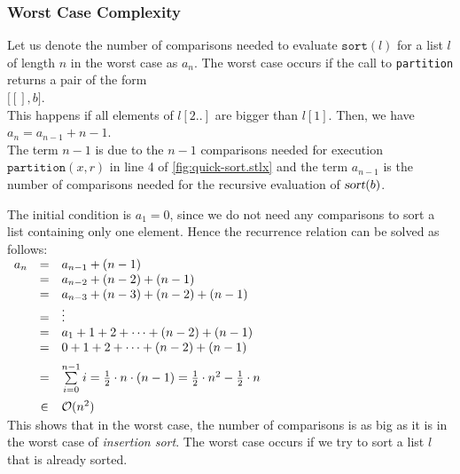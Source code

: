 \subsubsection{Worst Case Complexity}
Let us denote the number of comparisons needed to evaluate $\mathtt{sort}(l)$ for a list $l$ of
length $n$ in the worst case as $a_n$.  The worst case occurs if the call to \texttt{partition}
returns a pair of the form
\\[0.2cm]
\hspace*{1.3cm}
$\bigl[ [], b \bigr]$.
\\[0.2cm]
This happens if all elements of $l[2..]$ are bigger than $l[1]$.  Then, we have
\\[0.2cm]
\hspace*{1.3cm}
$a_n = a_{n-1} + n - 1$. 
\\[0.2cm]
The term $n-1$ is due to the $n-1$ comparisons needed for execution
$\texttt{partition}(x,r)$ in line 4 of \ref{fig:quick-sort.stlx} and the term $a_{n-1}$ is the
number of comparisons needed for the recursive evaluation of $\textsl{sort}(b)$.

The initial condition is $a_1 = 0$, since we do not need any comparisons to sort a list
containing only one element.
Hence the recurrence relation can be solved as follows:
\\[0.2cm]
\hspace*{1.3cm}
$
\begin{array}{lcl}
  a_n & = & a_{n-1} + (n-1) \\
      & = & a_{n-2} + (n-2) + (n-1) \\
      & = & a_{n-3} + (n-3) + (n-2) + (n-1) \\
      & = & \vdots \\
      & = & a_{1} + 1 + 2 + \cdots  + (n-2) + (n-1) \\
      & = & 0 + 1 + 2 + \cdots  + (n-2) + (n-1) \\[0.2cm]
      & = & \sum\limits_{i=0}^{n-1} i  =  \frac{1}{2} \cdot n \cdot(n - 1) =
            \frac{1}{2} \cdot n^2 - \frac{1}{2} \cdot n \\[0.4cm]
      & \in & \mathcal{O}(n^2)
\end{array}
$
\\[0.2cm]
This shows that in the worst case, the number of comparisons is as big as it is in the worst case of 
\emph{insertion sort}.  The worst case occurs if we try to sort a list $l$ that is already sorted.


